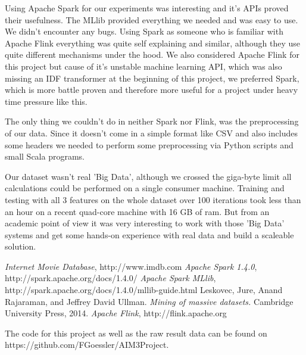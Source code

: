 \documentclass{vldb}
\begin{document}
\par Using Apache Spark for our experiments was interesting and it's APIs proved their usefulness. The MLlib provided everything we needed and was easy to use. We didn't encounter any bugs. Using Spark as someone who is familiar with Apache Flink\cite{flink} everything was quite self explaining and similar, although they use quite different mechanisms under the hood. We also considered Apache Flink for this project but cause of it's unstable machine learning API, which was also missing an IDF transformer at the beginning of this project, we preferred Spark, which is more battle proven and therefore more useful for a project under heavy time pressure like this.
\par The only thing we couldn't do in neither Spark nor Flink, was the preprocessing of our data. Since it doesn't come in a simple format like CSV and also includes some headers we needed to perform some preprocessing via Python scripts and small Scala programs. 
\par Our dataset wasn't real 'Big Data', although we crossed the giga-byte limit all calculations could be performed on a single consumer machine. Training and testing with all 3 features on the whole dataset over 100 iterations took less than an hour on a recent quad-core machine with 16 GB of ram. But from an academic point of view it was very interesting to work with those 'Big Data' systems and get some hands-on experience with real data and build a scaleable solution.


\begin{thebibliography}{9} 
 \emph{Internet Movie Database}, http://www.imdb.com
 \emph{Apache Spark 1.4.0}, http://spark.apache.org/docs/1.4.0/
 \emph{Apache Spark MLlib}, http://spark.apache.org/docs/1.4.0/mllib-guide.html
 Leskovec, Jure, Anand Rajaraman, and Jeffrey David Ullman. \emph{Mining of massive datasets.} Cambridge University Press, 2014.
 \emph{Apache Flink}, http://flink.apache.org
\end{thebibliography}

\bigskip
\par The code for this project as well as the raw result data can be found on https://github.com/FGoessler/AIM3Project.
\end{document}
